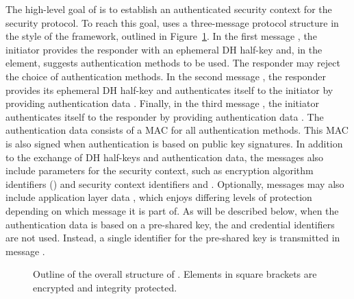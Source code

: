 \fillhack
The high-level goal of \mEdhoc{} is to establish an authenticated security
context for the \mOscore{} security protocol.
%
To reach this goal, \mEdhoc{} uses a three-message protocol structure
in the style of the \mNoise{} framework, outlined in
Figure~\ref{fig:edhocFramework}.
%
In the first message \mMsgone{}, the initiator provides the responder with an
ephemeral DH half-key \mGx{} and, in the \mMethod{} element, suggests
authentication methods to be used.
%
The responder may reject the choice of authentication methods.
%
In the second message \mMsgtwo{}, the responder provides its ephemeral
DH half-key \mGy{} and authenticates itself to the initiator by
providing authentication data \mAuthr{}.
%
Finally, in the third message \mMsgthree{}, the initiator authenticates itself
to the responder by providing authentication data \mAuthi{}.
%
The authentication data consists of a MAC for all authentication methods.
%
This MAC is also signed when authentication is based on public key signatures.
%
In addition to the exchange of DH half-keys and authentication data, the
messages also include parameters for the \mOscore{} security context, such as
encryption algorithm identifiers (\mSuites{}) and \mOscore{} security context
identifiers \mCi{} and \mCr{}.
%
Optionally, messages may also include application layer data \mAD{}, which
enjoys differing levels of protection depending on which message it is part of.
%
As will be described below, when the authentication data is based on
a pre-shared key, the \mCredi{} and \mCredr{} credential identifiers are not
used.
%
Instead, a single identifier for the pre-shared key is transmitted in
message \mMsgone{}.
%
\begin{figure}
\centering
{}
\caption{Outline of the overall structure of \mEdhoc{}. Elements in square
brackets are encrypted and integrity protected.}
\label{fig:edhocFramework}
\end{figure}

